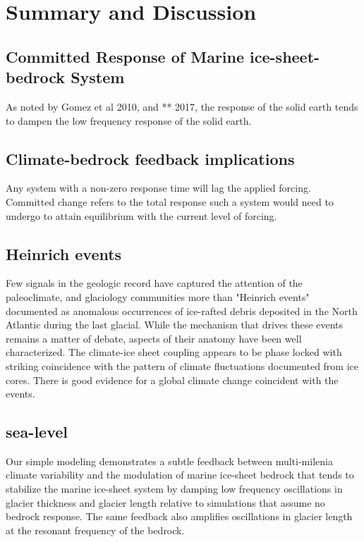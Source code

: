 \documentclass[tc, manuscript]{copernicus}
\begin{document}
\section{Summary and Discussion}
\subsection{Committed Response of Marine ice-sheet-bedrock System}
As noted by Gomez et al 2010, and ** 2017, the response of the solid earth tends to dampen the low frequency response of the solid earth.

\subsection{Climate-bedrock feedback implications}
Any system with a non-zero response time will lag the applied forcing.
Committed change refers to the total response such a system would need to undergo to attain equilibrium with the current level of forcing.


\subsection{Heinrich events}
Few signals in the geologic record have captured the attention of the paleoclimate, and glaciology communities more than "Heinrich events" documented as anomalous occurrences of ice-rafted debris deposited in the North Atlantic during the last glacial.
While the mechanism that drives these events remains a matter of debate, aspects of their anatomy have been well characterized.
The climate-ice sheet coupling appears to be phase locked with striking coincidence with the pattern of climate fluctuations documented from ice cores.
There is good evidence for a global climate change coincident with the events.





\subsection{sea-level}


\conclusions  
Our simple modeling demonstrates a subtle feedback between multi-milenia climate variability and the modulation of marine ice-sheet bedrock that tends to stabilize the marine ice-sheet system by damping low frequency oscillations in glacier thickness and glacier length relative to simulations that assume no bedrock response. 
The same feedback also amplifies oscillations in glacier length at the resonant frequency of the bedrock.
\end{document}
